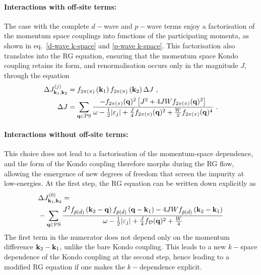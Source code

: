 \documentclass[reprint,hidelinks]{revtex4-2}
\begin{document}
\paragraph{Interactions with off-site terms:}
The case with the complete \(d-\)wave and \(p-\)wave terms enjoy a factorisation of the momentum space couplings into functions of the participating momenta, as shown in eq.~\ref{d-wave k-space} and \ref{p-wave k-space}. This factorisation also translates into the RG equation, ensuring that the momentum space Kondo coupling retains its form, and renormalisation occurs only in the magnitude \(J\), through the equation
\begin{equation}\begin{aligned}
	\Delta J^{(j)}_{{\bf k}_1, {\bf k}_2} &= f_{{2\pi}(\pi)}\left({\bf k}_1\right) f_{{2\pi}(\pi)}\left({\bf k}_2\right) \Delta J~,\\
\Delta J &= \sum_{{\bf q} \in \text{PS}} \frac{-f_{2\pi(\pi)}({\bf q})^2\left[J^2 + 4JWf_{2\pi(\pi)}({\bf q})^2\right]}{\omega - \frac{1}{2}|\varepsilon_j| + \frac{J}{4}f_{2\pi(\pi)}({\bf q})^2 + \frac{W}{2}f_{2\pi(\pi)}({\bf q})^4}~.
\end{aligned}\end{equation}
\paragraph{Interactions without off-site terms:}
This choice does not lead to a factorisation of the momentum-space dependence, and the form of the Kondo coupling therefore morphs during the RG flow, allowing the emergence of new degrees of freedom that screen the impurity at low-energies. At the first step, the RG equation can be written down explicitly as
\begin{equation}\begin{aligned}
	&\Delta J^{(0)}_{{\bf k}_1, {\bf k}_2} =\\
	&-\sum_{{\bf q} \in \text{PS}} \frac{J^2 f_{\bar p(\bar d)}\left({\bf k}_2 - {\bf q}\right) f_{\bar p(\bar d)}\left({\bf q} - {\bf k}_1\right) - 4JW f_{\bar p(\bar d)}\left({\bf k}_2 - {\bf k}_1\right)}{\omega - \frac{1}{2}|\varepsilon_j| + \frac{J}{4}f_\mathcal{D}({\bf q})^2 + \frac{W}{4}}
\end{aligned}\end{equation}
The first term in the numerator does not depend only on the momentum difference \({\bf k}_2 - {\bf k}_1\), unlike the bare Kondo coupling. This leads to a new \(k-\)space dependence of the Kondo coupling at the second step, hence leading to a modified RG equation if one makes the \(k-\)dependence explicit.
\end{document}
